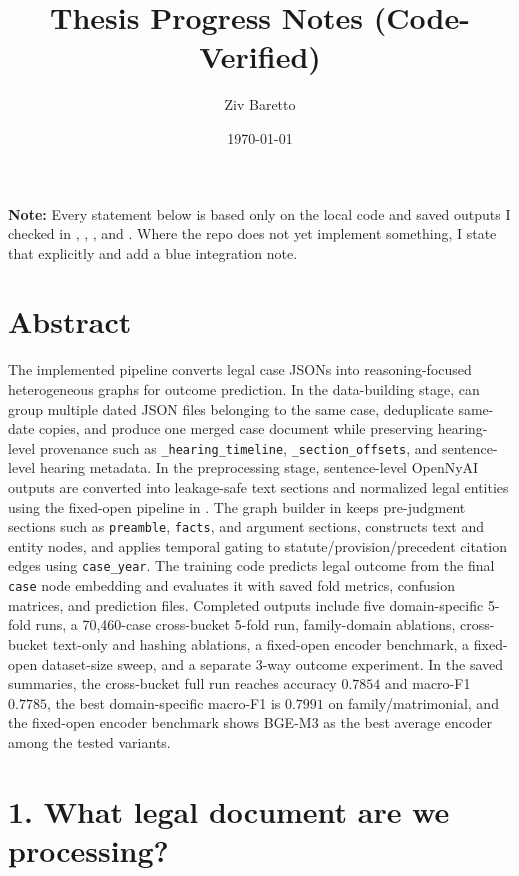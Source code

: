 \documentclass[12pt,a4paper]{article}
\title{\textbf{Thesis Progress Notes (Code-Verified)}}
\author{Ziv Baretto}
\date{\today}
\begin{document}
\maketitle

\noindent\textbf{Note:} Every statement below is based only on the local code and saved outputs I checked in , , , and . Where the repo does not yet implement something, I state that explicitly and add a blue integration note.

\section*{Abstract}

The implemented pipeline converts legal case JSONs into reasoning-focused heterogeneous graphs for outcome prediction. In the data-building stage,  can group multiple dated JSON files belonging to the same case, deduplicate same-date copies, and produce one merged case document while preserving hearing-level provenance such as \texttt{\_hearing\_timeline}, \texttt{\_section\_offsets}, and sentence-level hearing metadata. In the preprocessing stage, sentence-level OpenNyAI outputs are converted into leakage-safe text sections and normalized legal entities using the fixed-open pipeline in . The graph builder in  keeps pre-judgment sections such as \texttt{preamble}, \texttt{facts}, and argument sections, constructs text and entity nodes, and applies temporal gating to statute/provision/precedent citation edges using \texttt{case\_year}. The training code predicts legal outcome from the final \texttt{case} node embedding and evaluates it with saved fold metrics, confusion matrices, and prediction files. Completed outputs include five domain-specific 5-fold runs, a 70{,}460-case cross-bucket 5-fold run, family-domain ablations, cross-bucket text-only and hashing ablations, a fixed-open encoder benchmark, a fixed-open dataset-size sweep, and a separate 3-way outcome experiment. In the saved summaries, the cross-bucket full run reaches accuracy \(0.7854\) and macro-F1 \(0.7785\), the best domain-specific macro-F1 is \(0.7991\) on family/matrimonial, and the fixed-open encoder benchmark shows BGE-M3 as the best average encoder among the tested variants.

\section*{1. What legal document are we processing?}
\end{document}
